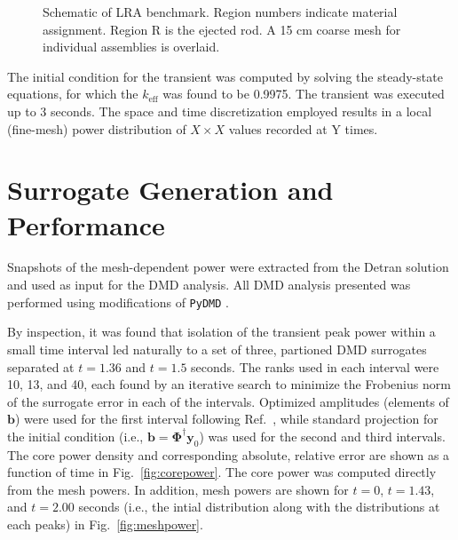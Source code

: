 \documentclass{anstrans}
\begin{document}
\begin{figure}
\caption{Schematic of LRA benchmark.  Region numbers indicate material assignment.  Region R is the  ejected rod.  A 15 cm coarse mesh for individual assemblies is overlaid.}
\label{fig:lra_core}
\end{figure}

The initial condition for the transient was computed by solving the steady-state equations, for which the $k_{\text{eff}}$ was found to be 0.9975.
The transient was executed up to 3 seconds.
The space and time discretization employed results in a local (fine-mesh) power distribution of $X \times X$ values recorded at Y times.


\section{Surrogate Generation and Performance}

Snapshots of the mesh-dependent power were extracted from the Detran solution and used as input for the DMD analysis. All DMD analysis presented was performed using modifications of {\tt PyDMD} \cite{demo2018pydmd}.
 
By inspection, it was found that isolation of the transient peak power within a small time interval led naturally to a set of three, partioned DMD surrogates separated at $t = 1.36$ and $t = 1.5$ seconds.  The ranks used in each interval were 10, 13, and 40, each found by an iterative search to minimize the Frobenius norm of the surrogate error in each of the intervals.  Optimized amplitudes (elements of $\mathbf{b}$) were used for the first interval following Ref.~\cite{jovanovic2014sparsity}, while standard projection for the initial condition (i.e., $\mathbf{b}=\bm{\Phi}^{\dagger} \mathbf{y}_0$) was used for the second and third intervals.    The core power density and corresponding absolute, relative error are shown as a function of time in Fig.~\ref{fig:corepower}.  The core power was computed directly from the mesh powers. In addition, mesh powers are shown for $t=0$, $t=1.43$, and $t=2.00$ seconds (i.e., the intial distribution along with the distributions at each peaks) in Fig.~\ref{fig:meshpower}.  
\end{document}
